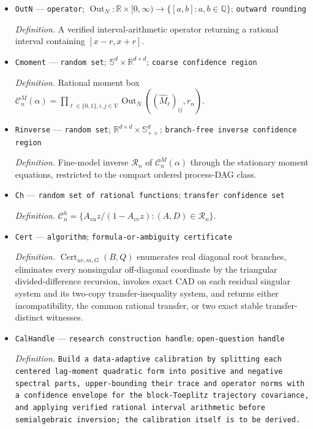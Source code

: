 \documentclass{article}
\begin{document}
\begin{itemize}
  \item \texttt{OutN} --- \texttt{operator}; \(\operatorname{Out}_N:\mathbb R\times[0,\infty)\to\{[a,b]:a,b\in\mathbb Q\}\); \texttt{outward rounding}
  \par\smallskip\noindent\emph{Definition.} A verified interval-arithmetic operator returning a rational interval containing \([x-r,x+r]\).
  \item \texttt{Cmoment} --- \texttt{random set}; \(\mathbb S^d\times\mathbb R^{d\times d}\); \texttt{coarse confidence region}
  \par\smallskip\noindent\emph{Definition.} Rational moment box \(\mathcal C_n^M(\alpha)=\prod_{\ell\in\{0,1\},i,j\in V}\operatorname{Out}_N((\widehat M_\ell)_{ij},r_n)\).
  \item \texttt{Rinverse} --- \texttt{random set}; \(\mathbb R^{d\times d}\times\mathbb S_{++}^d\); \texttt{branch-\allowbreak{}free inverse confidence region}
  \par\smallskip\noindent\emph{Definition.} Fine-model inverse \(\mathcal R_n\) of \(\mathcal C_n^M(\alpha)\) through the stationary moment equations, restricted to the compact ordered process-DAG class.
  \item \texttt{Ch} --- \texttt{random set of rational functions}; \texttt{transfer confidence set}
  \par\smallskip\noindent\emph{Definition.} \(\mathcal C_n^h=\{A_{vu}z/(1-A_{vv}z):(A,D)\in\mathcal R_n\}\).
  \item \texttt{Cert} --- \texttt{algorithm}; \texttt{formula-\allowbreak{}or-\allowbreak{}ambiguity certificate}
  \par\smallskip\noindent\emph{Definition.} \(\operatorname{Cert}_{uv,m,G}(B,Q)\) enumerates real diagonal root branches, eliminates every nonsingular off-diagonal coordinate by the triangular divided-difference recursion, invokes exact CAD on each residual singular system and its two-copy transfer-inequality system, and returns either incompatibility, the common rational transfer, or two exact stable transfer-distinct witnesses.
  \item \texttt{CalHandle} --- \texttt{research construction handle}; \texttt{open-\allowbreak{}question handle}
  \par\smallskip\noindent\emph{Definition.} \texttt{Build a data-\allowbreak{}adaptive calibration by splitting each centered lag-\allowbreak{}moment quadratic form into positive and negative spectral parts,\allowbreak{} upper-\allowbreak{}bounding their trace and operator norms with a confidence envelope for the block-\allowbreak{}Toeplitz trajectory covariance,\allowbreak{} and applying verified rational interval arithmetic before semialgebraic inversion;\allowbreak{} the calibration itself is to be derived.}

\end{itemize}
\end{document}
